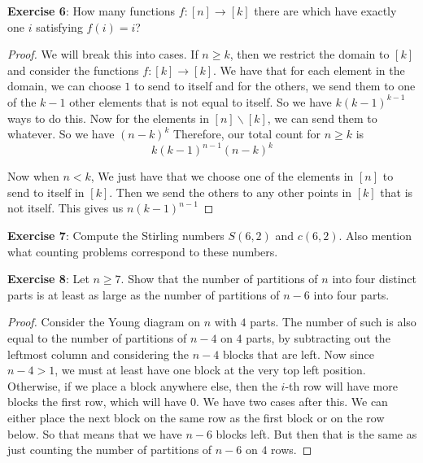 \documentclass{article}
\begin{document}
\textbf{Exercise 6}: How many functions $f : [n] \rightarrow [k]$ there are which have exactly one $i$ satisfying $f(i)= i$?
    \begin{proof}
        We will break this into cases. If $ n\geq k$, then we restrict the domain to $[k]$ and consider the functions $f : [k] \rightarrow [k]$. We have that for each element in the domain, we can choose $1$ to send to itself and for the others, we send them to one of the $k - 1$ other elements that is not equal to itself. So we have $k(k - 1)^{k - 1}$ ways to do this. Now for the elements in $[n] \backslash [k]$, we can send them to whatever. So we have $(n - k)^{k}$ Therefore, our total count for $n \geq k$ is
            \begin{equation*}
                k(k - 1)^{n - 1}(n - k)^{k}
            \end{equation*}

        Now when $n < k$, We just have that we choose one of the elements in $[n]$ to send to itself in $[k]$. Then we send the others to any other points in $[k]$ that is not itself. This gives us $n(k - 1)^{n - 1}$
    \end{proof}

\textbf{Exercise 7}: Compute the Stirling numbers $S(6, 2)$ and $c(6, 2)$. Also mention what counting problems correspond to these numbers.

\textbf{Exercise 8}: Let $n \geq 7$. Show that the number of partitions of $n$ into four distinct parts is at least as large as the number of partitions of $n- 6$ into four parts.
    \begin{proof}
        Consider the Young diagram on $n$ with $4$ parts. The number of such is also equal to the number of partitions of $n - 4$ on $4$ parts, by subtracting out the leftmost column and considering the $n - 4$ blocks that are left. Now since $n - 4 >  1$, we must at least have one block at the very top left position. Otherwise, if we place a block anywhere else, then the $i$-th row will have more blocks the first row, which will have $0$. We have two cases after this. We can either place the next block on the same row as the first block or on the row below. So that means that we have $n - 6$ blocks left. But then that is the same as just counting the number of partitions of $n - 6$ on $4$ rows.
    \end{proof}
\end{document}
